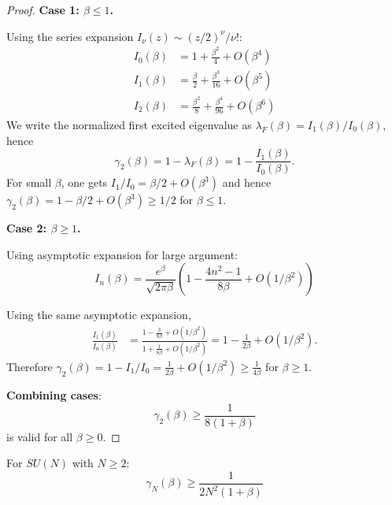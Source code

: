 \begin{proof}
\textbf{Case 1: $\beta \leq 1$.}

Using the series expansion $I_\nu(z) \sim (z/2)^\nu / \nu!$:
\begin{align}
I_0(\beta) &= 1 + \frac{\beta^2}{4} + O(\beta^4) \\
I_1(\beta) &= \frac{\beta}{2} + \frac{\beta^3}{16} + O(\beta^5) \\
I_2(\beta) &= \frac{\beta^2}{8} + \frac{\beta^4}{96} + O(\beta^6)
\end{align}
We write the normalized first excited eigenvalue as $\lambda_F(\beta)=I_1(\beta)/I_0(\beta)$, hence
\begin{equation}
\gamma_2(\beta)=1-\lambda_F(\beta)=1-\frac{I_1(\beta)}{I_0(\beta)}.
\end{equation}
For small $\beta$, one gets $I_1/I_0 = \beta/2 + O(\beta^3)$ and hence $\gamma_2(\beta)=1-\beta/2+O(\beta^3)\ge 1/2$ for $\beta\le 1$.

\textbf{Case 2: $\beta \geq 1$.}

Using asymptotic expansion for large argument:
\begin{equation}
I_n(\beta) = \frac{e^\beta}{\sqrt{2\pi\beta}} \left(1 - \frac{4n^2-1}{8\beta} + O(1/\beta^2)\right)
\end{equation}

Using the same asymptotic expansion,
\begin{align}
\frac{I_1(\beta)}{I_0(\beta)}
&= \frac{1 - \frac{3}{8\beta} + O(1/\beta^2)}{1 + \frac{1}{8\beta} + O(1/\beta^2)}
= 1 - \frac{1}{2\beta} + O(1/\beta^2).
\end{align}
Therefore $\gamma_2(\beta)=1-I_1/I_0 = \frac{1}{2\beta}+O(1/\beta^2)\ge \frac{1}{4\beta}$ for $\beta\ge 1$.

\textbf{Combining cases}:
\begin{equation}
\gamma_2(\beta) \geq \frac{1}{8(1 + \beta)}
\end{equation}
is valid for all $\beta \geq 0$.
\end{proof}

\begin{theorem}
\label{thm:sun-explicit}
For $SU(N)$ with $N \geq 2$:
\begin{equation}
\gamma_N(\beta) \geq \frac{1}{2N^2(1 + \beta)}
\end{equation}
\end{theorem}

